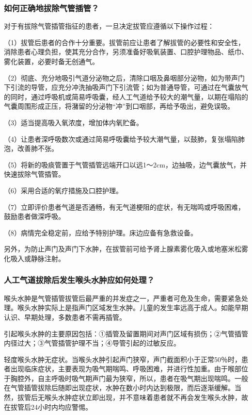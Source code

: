 \subsubsection{如何正确地拔除气管插管？}

对于有拔除气管插管指征的患者，一旦决定拔管应遵循以下操作过程：

（1）拔管后患者的合作十分重要。拔管前应让患者了解拔管的必要性和安全性，消除患者心理负担，使其充分合作，另须准备好吸氧装置、口腔护理物品、纸巾、雾化装置，必要时备无创通气。

（2）彻底、充分地吸引气道分泌物之后，清除口咽及鼻咽部分泌物，如为带声门下引流的导管，应充分冲洗抽吸声门下引流管；如为普通导管，可通过在气囊放气的同时，通过呼吸机或简易呼吸囊，经人工气道给予较大的潮气量，以期在塌陷的气囊周围形成正压，将潴留的分泌物“冲”到口咽部，再给予吸出，避免误吸。

（3）适当提高吸入氧浓度，增加体内氧贮备。

（4）让患者深呼吸数次或通过简易呼吸囊给予较大潮气量，以鼓肺，复张塌陷肺泡，改善肺不张。

（5）将新的吸痰管置于气管插管远端开口以远1～2cm，边抽吸，边气囊放气，并快速拔除气管插管。

（6）采用合适的氧疗措施及口腔护理。

（7）立即评价患者气道是否通畅，有无气道梗阻的症状，有无喘鸣或呼吸困难，鼓励患者做深呼吸。

（8）病情完全稳定前，应给予特别护理。床边应备有急救设备。

另外，为防止声门及声门下水肿，在拔管前可给予肾上腺素雾化吸入或地塞米松雾化吸入或静脉注射。

\subsubsection{人工气道拔除后发生喉头水肿应如何处理？}

喉头水肿是气管插管拔管后最严重的并发症之一，严重者可危及生命，需要紧急处理。喉头水肿实际上是指声门区域发生水肿。儿童的发生率远高于成人。如能早期认识、早期处理，多数患者不需再插管。

引起喉头水肿的主要原因包括：①插管及留置期间对声门区域有损伤；②气管插管内径过大；③气管插管护理不当；④导管引起的过敏反应。

轻度喉头水肿无症状。当喉头水肿引起声门狭窄，声门截面积小于正常50％时，患者出现临床症状，主要表现为吸气期喘鸣、呼吸困难，并进行性加重。由于喉部位于胸腔外，自主呼吸时吸气期声门最为狭窄，所以，患者在吸气期出现喘鸣。一般在气管插管拔除后随即出现症状，水肿在数小时内达到极限，而后逐渐缓解。当然，拔管后无喉头水肿症状立即出现，并不意味着患者就不再会发生喉头水肿，故在拔管后24小时内均应警惕。

